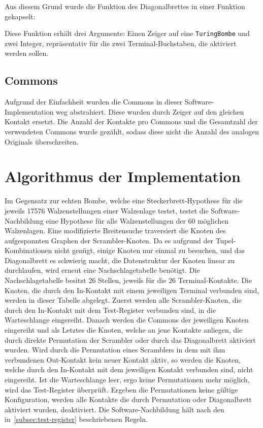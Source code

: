 Aus diesem Grund wurde die Funktion des Diagonalbrettes in einer Funktion gekapselt:

\noindent

Diese Funktion erhält drei Argumente: Einen Zeiger auf eine \texttt{TuringBombe} und zwei Integer, repräsentativ für die zwei Terminal-Buchstaben, die aktiviert werden sollen.


\subsection{Commons}\label{subsec:impl_commons}
Aufgrund der Einfachheit wurden die Commons in dieser Software-Implementation \glqq weg abstrahiert\grqq.
Diese wurden durch Zeiger auf den gleichen Kontakt ersetzt.
Die Anzahl der Kontakte pro Commons und die Gesamtzahl der verwendeten Commons wurde gezählt, sodass diese nicht die Anzahl des analogen Originals überschreiten.

\section{Algorithmus der Implementation}\label{sec:algorithm_bombe}
Im Gegensatz zur \glqq echten\grqq{} Bombe, welche eine Steckerbrett-Hypothese für die jeweils 17576 Walzenstellungen einer Walzenlage testet, testet die Software-Nachbildung eine Hypothese für alle Walzenstellungen der 60 möglichen Walzenlagen.
Eine modifizierte Breitensuche traversiert die Knoten des aufgespannten Graphen der \glqq Scrambler-Knoten\grqq.
Da es aufgrund der Tupel-Kombinationen nicht genügt, einige Knoten nur einmal zu besuchen, und das Diagonalbrett es schwierig macht, die Datenstruktur der Knoten linear zu durchlaufen, wird erneut eine \glqq Nachschlagetabelle\grqq{} benötigt.
Die Nachschlagetabelle besitzt 26 Stellen, jeweils für die 26 Terminal-Kontakte.
Die Knoten, die durch den In-Kontakt mit einem jeweiligen Terminal verbunden sind, werden in dieser Tabelle abgelegt.
Zuerst werden alle Scrambler-Knoten, die durch den In-Kontakt mit dem Test-Register verbunden sind, in die Warteschlange eingereiht. 
Danach werden die Commons der jeweiligen Knoten eingereiht und als Letztes die Knoten, welche an jene Kontakte anliegen, die durch direkte Permutation der Scrambler oder durch das Diagonalbrett aktiviert wurden.
Wird durch die Permutation eines Scramblers in dem mit ihm verbundenen Out-Kontakt kein neuer Kontakt aktiv, so werden die Knoten, welche durch den In-Kontakt mit dem jeweiligen Kontakt verbunden sind, nicht eingereiht.
Ist die Warteschlange leer, ergo keine Permutationen mehr möglich, wird das Test-Register überprüft.
Ergeben die Permutationen keine gültige Konfiguration, werden alle Kontakte die durch Permutation oder Diagonalbrett aktiviert wurden, deaktiviert. 
Die Software-Nachbildung hält nach den in~\cref{subsec:test-register} beschriebenen Regeln.

